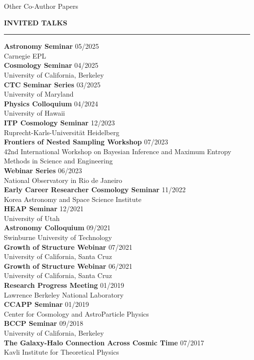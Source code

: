 \documentclass[12pt]{article}
\renewenvironment{section}[1]
  {
  \medskip
  {\color{aublue} \MakeUppercase{\bf #1}}
  \smallskip
  \hrule
  \medskip
  \begin{adjustwidth}{0.3cm}{}
  }
  {
  \end{adjustwidth}
  }
\newenvironment{ref-section}[1]
  {
  \medskip
  {\color{aublue} \MakeUppercase{\bf #1}}
  \smallskip
  \hrule
  \medskip
  \begin{refsection}
  }
  {
  \end{refsection}
  }
\newcommand{\entry}[3]{{\bf #1} \hfill {#2} \\ {#3}}
\begin{document}
\begin{ref-section}{Other Co-Author Papers}
  \nocite{Rauhut2025_arXiv_2507_6098, Heydenreich2025_arXiv_2506_1677, Kwiecien2025_PhRvD_111_3524, DESICollaboration2025_arXiv_2503_4745, Blake2025_OJAp_8_24, Chen2024_PhRvD_110_3518, Mitra2024_MNRAS_533_3647, Yuan2024_MNRAS_533_589, Wang2024_ApJ_971_119, DESICollaboration2024_AJ_168_58, Xhakaj2024_MNRAS_530_4203, DESICollaboration2024_AJ_167_62, Hadzhiyska2023_MNRAS_525_4367, Ruggeri2023_MNRAS_525_3865, Wang2022_MNRAS_516_4003, DESICollaboration2022_AJ_164_207, Huang2022_MNRAS_515_4722, Xhakaj2022_MNRAS_514_2876, Dawson2022_arXiv_2203_7291, Leauthaud2022_MNRAS_510_6150, Wang2020_MNRAS_498_4450, vandenBosch2019_MNRAS_488_4984, Wang2019_MNRAS_488_3541, Zentner2019_MNRAS_485_1196, Campbell2018_MNRAS_477_359, Villarreal2017_MNRAS_472_1088, Nelson2016_ApJ_828_27, Momcheva2016_ApJS_225_27}
  \printbibliography[heading=none]
\end{ref-section}

\begin{section}{Invited Talks}
  \entry{Astronomy Seminar}{05/2025}{Carnegie EPL} \\
  \entry{Cosmology Seminar}{04/2025}{University of California, Berkeley} \\
  \entry{CTC Seminar Series}{03/2025}{University of Maryland} \\
  \entry{Physics Colloquium}{04/2024}{University of Hawaii} \\
  \entry{ITP Cosmology Seminar}{12/2023}{Ruprecht-Karls-Universität Heidelberg} \\
  \entry{Frontiers of Nested Sampling Workshop}{07/2023}{42nd  International Workshop on Bayesian Inference and Maximum Entropy Methods in Science and Engineering} \\
  \entry{Webinar Series}{06/2023}{National Observatory in Rio de Janeiro} \\
  \entry{Early Career Researcher Cosmology Seminar}{11/2022}{Korea Astronomy and Space Science Institute} \\
  \entry{HEAP Seminar}{12/2021}{University of Utah} \\
  \entry{Astronomy Colloquium}{09/2021}{Swinburne University of Technology} \\
  \entry{Growth of Structure Webinar}{07/2021}{University of California, Santa Cruz} \\
  \entry{Growth of Structure Webinar}{06/2021}{University of California, Santa Cruz} \\
  \entry{Research Progress Meeting}{01/2019}{Lawrence Berkeley National Laboratory} \\
  \entry{CCAPP Seminar}{01/2019}{Center for Cosmology and AstroParticle Physics} \\
  \entry{BCCP Seminar}{09/2018}{University of California, Berkeley} \\
  \entry{The Galaxy-Halo Connection Across Cosmic Time}{07/2017}{Kavli Institute for Theoretical Physics}
\end{section}
\end{document}
